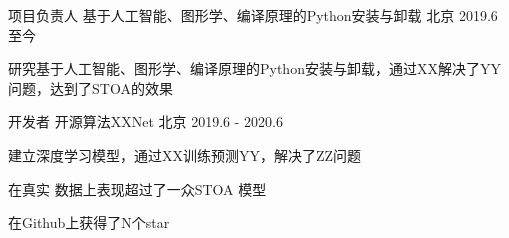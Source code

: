 

\begin{cventries}

  \cventry
    {项目负责人} %
    {基于人工智能、图形学、编译原理的Python安装与卸载} %
    {北京} %
    {2019.6 至今} %
    {
      \begin{cvitems} %
        \item {研究基于人工智能、图形学、编译原理的Python安装与卸载，通过XX解决了YY问题，达到了STOA的效果}
      \end{cvitems}
    }

  \cventry
    {开发者} %
    {开源算法XXNet} %
    {北京} %
    {2019.6 - 2020.6} %
    {
      \begin{cvitems} %
        \item {建立深度学习模型，通过XX训练预测YY，解决了ZZ问题}
        \item {在真实 数据上表现超过了一众STOA 模型}
        \item {在Github上获得了N个star}
      \end{cvitems}
    }

\end{cventries}
